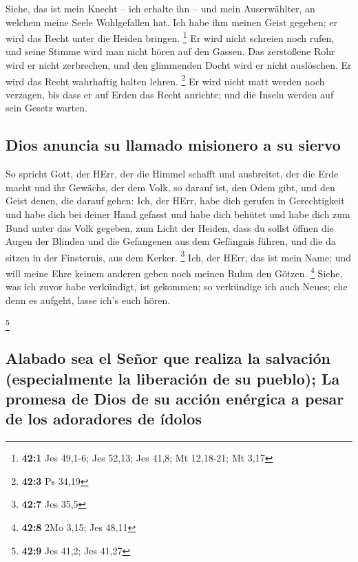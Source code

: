  Siehe, das ist mein Knecht -- ich erhalte ihn -- und mein
Auserwählter, an welchem meine Seele Wohlgefallen hat. Ich habe ihm
meinen Geist gegeben; er wird das Recht unter die Heiden bringen.
\footnote{\textbf{42:1} Jes 49,1-6; Jes 52,13; Jes 41,8; Mt 12,18-21; Mt
  3,17}  Er wird nicht schreien noch rufen, und seine
Stimme wird man nicht hören auf den Gassen.  Das
zerstoßene Rohr wird er nicht zerbrechen, und den glimmenden Docht wird
er nicht auslöschen. Er wird das Recht wahrhaftig halten lehren.
\footnote{\textbf{42:3} Ps 34,19}  Er wird nicht matt
werden noch verzagen, bis dass er auf Erden das Recht anrichte; und die
Inseln werden auf sein Gesetz warten.

\hypertarget{dios-anuncia-su-llamado-misionero-a-su-siervo}{%
\subsection{Dios anuncia su llamado misionero a su
siervo}\label{dios-anuncia-su-llamado-misionero-a-su-siervo}}

 So spricht Gott, der HErr, der die Himmel schafft und
ausbreitet, der die Erde macht und ihr Gewächs, der dem Volk, so darauf
ist, den Odem gibt, und den Geist denen, die darauf gehen:
 Ich, der HErr, habe dich gerufen in Gerechtigkeit und
habe dich bei deiner Hand gefasst und habe dich behütet und habe dich
zum Bund unter das Volk gegeben, zum Licht der Heiden, 
dass du sollst öffnen die Augen der Blinden und die Gefangenen aus dem
Gefängnis führen, und die da sitzen in der Finsternis, aus dem Kerker.
\footnote{\textbf{42:7} Jes 35,5}  Ich, der HErr, das ist
mein Name; und will meine Ehre keinem anderen geben noch meinen Ruhm den
Götzen. \footnote{\textbf{42:8} 2Mo 3,15; Jes 48,11} 
Siehe, was ich zuvor habe verkündigt, ist gekommen; so verkündige ich
auch Neues; ehe denn es aufgeht, lasse ich's euch hören.

\footnote{\textbf{42:9} Jes 41,2; Jes 41,27}

\hypertarget{alabado-sea-el-seuxf1or-que-realiza-la-salvaciuxf3n-especialmente-la-liberaciuxf3n-de-su-pueblo-la-promesa-de-dios-de-su-acciuxf3n-enuxe9rgica-a-pesar-de-los-adoradores-de-uxeddolos}{%
\subsection{Alabado sea el Señor que realiza la salvación (especialmente
la liberación de su pueblo); La promesa de Dios de su acción enérgica a
pesar de los adoradores de
ídolos}\label{alabado-sea-el-seuxf1or-que-realiza-la-salvaciuxf3n-especialmente-la-liberaciuxf3n-de-su-pueblo-la-promesa-de-dios-de-su-acciuxf3n-enuxe9rgica-a-pesar-de-los-adoradores-de-uxeddolos}}

